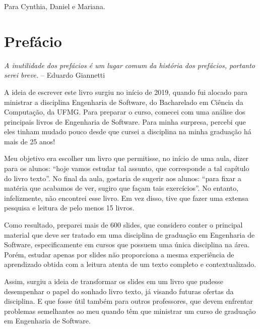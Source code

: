 \documentclass[
  11pt,
  twoside]{book}
\renewenvironment{quote}{\centering \vspace{1.5ex} \begin{tcolorbox}[colback=backcolor, width=4.9in]}{\end{tcolorbox}}
\begin{document}
\newpage

\newpage
\thispagestyle{empty}
\vspace*{5cm}
\begin{center}
\large Para Cynthia, Daniel e Mariana.
\end{center}

\newpage
\newpage

\tableofcontents

\mainmatter
\frontmatter

\hypertarget{prefuxe1cio}{%
\chapter*{Prefácio}\label{prefuxe1cio}}

\begin{quote}
\emph{A inutilidade dos prefácios é um lugar comum da história dos
prefácios, portanto serei breve.} -- Eduardo Giannetti
\end{quote}

A ideia de escrever este livro surgiu no início de 2019, quando fui
alocado para ministrar a disciplina Engenharia de Software, do
Bacharelado em Ciência da Computação, da UFMG. Para preparar o curso,
comecei com uma análise dos principais livros de Engenharia de Software.
Para minha surpresa, percebi que eles tinham mudado pouco desde que
cursei a disciplina na minha graduação há mais de 25 anos!

Meu objetivo era escolher um livro que permitisse, no início de uma
aula, dizer para os alunos: ``hoje vamos estudar tal assunto, que
corresponde a tal capítulo do livro texto''. No final da aula, gostaria
de sugerir aos alunos: ``para fixar a matéria que acabamos de ver,
sugiro que façam tais exercícios''. No entanto, infelizmente, não
encontrei esse livro. Em vez disso, tive que fazer uma extensa pesquisa
e leitura de pelo menos 15 livros.

Como resultado, preparei mais de 600 slides, que considero conter o
principal material que deve ser tratado em uma disciplina de graduação
em Engenharia de Software, especificamente em cursos que possuem uma
única disciplina na área. Porém, estudar apenas por slides não
proporciona a mesma experiência de aprendizado obtida com a leitura
atenta de um texto completo e contextualizado.

Assim, surgiu a ideia de transformar os slides em um livro que pudesse
desempenhar o papel do sonhado livro texto, já visando futuras ofertas
da disciplina. E que fosse útil também para outros professores, que
devem enfrentar problemas semelhantes ao meu quando têm que ministrar um
curso de graduação em Engenharia de Software.
\end{document}
